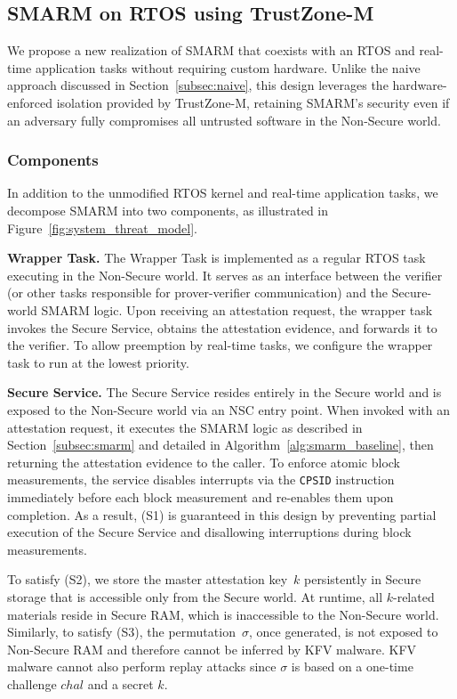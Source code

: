\documentclass{ieeeaccess}
\begin{document}
\subsection{SMARM on RTOS using TrustZone-M}

We propose a new realization of SMARM that coexists with an RTOS and real-time application tasks without requiring custom hardware.
Unlike the naive approach discussed in Section~\ref{subsec:naive}, this design leverages the hardware-enforced isolation provided by TrustZone-M, retaining SMARM's security even if an adversary fully compromises all untrusted software in the Non-Secure world.

\subsubsection{Components}

In addition to the unmodified RTOS kernel and real-time application tasks, we decompose SMARM into two components, as illustrated in Figure~\ref{fig:system_threat_model}.

\textbf{Wrapper Task.}
The Wrapper Task is implemented as a regular RTOS task executing in the Non-Secure world.
It serves as an interface between the verifier (or other tasks responsible for prover-verifier communication) and the Secure-world SMARM logic.
Upon receiving an attestation request, the wrapper task invokes the Secure Service, obtains the attestation evidence, and forwards it to the verifier.
To allow preemption by real-time tasks, we configure the wrapper task to run at the lowest priority.
    
\textbf{Secure Service.}
The Secure Service resides entirely in the Secure world and is exposed to the Non-Secure world via an NSC entry point.
When invoked with an attestation request, it executes the SMARM logic as described in Section~\ref{subsec:smarm} and detailed in Algorithm~\ref{alg:smarm_baseline}, then returning the attestation evidence to the caller.
To enforce atomic block measurements, the service disables interrupts via the \texttt{CPSID} instruction immediately before each block measurement and re-enables them upon completion.
As a result, (S1) is guaranteed in this design by preventing partial execution of the Secure Service and disallowing interruptions during block measurements.
    
To satisfy (S2), we store the master attestation key~$k$ persistently in Secure storage that is accessible only from the Secure world.
At runtime, all $k$-related materials reside in Secure RAM, which is inaccessible to the Non-Secure world.
Similarly, to satisfy (S3), the permutation~$\sigma$, once generated, is not exposed to Non-Secure RAM and therefore cannot be inferred by KFV malware.
KFV malware cannot also perform replay attacks since $\sigma$ is based on a one-time challenge $chal$ and a secret $k$.
\end{document}
